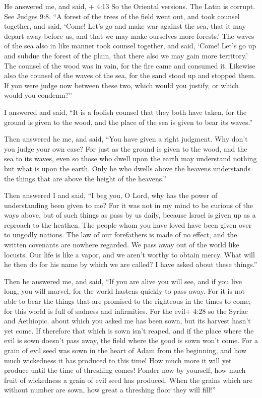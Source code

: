  He answered me, and said, + 4:13 So the Oriental versions.
The Latin is corrupt. See Judges 9:8. ``A forest of the trees of the
field went out, and took counsel together,  and said,
`Come! Let's go and make war against the sea, that it may depart away
before us, and that we may make ourselves more forests.' 
The waves of the sea also in like manner took counsel together, and
said, `Come! Let's go up and subdue the forest of the plain, that there
also we may gain more territory.'  The counsel of the wood
was in vain, for the fire came and consumed it.  Likewise
also the counsel of the waves of the sea, for the sand stood up and
stopped them.  If you were judge now between these two,
which would you justify, or which would you condemn?''

 I answered and said, ``It is a foolish counsel that they
both have taken, for the ground is given to the wood, and the place of
the sea is given to bear its waves.''

 Then answered he me, and said, ``You have given a right
judgment. Why don't you judge your own case?  For just as
the ground is given to the wood, and the sea to its waves, even so those
who dwell upon the earth may understand nothing but what is upon the
earth. Only he who dwells above the heavens understands the things that
are above the height of the heavens.''

 Then answered I and said, ``I beg you, O Lord, why has the
power of understanding been given to me?  For it was not in
my mind to be curious of the ways above, but of such things as pass by
us daily, because Israel is given up as a reproach to the heathen. The
people whom you have loved have been given over to ungodly nations. The
law of our forefathers is made of no effect, and the written covenants
are nowhere regarded.  We pass away out of the world like
locusts. Our life is like a vapor, and we aren't worthy to obtain mercy.
 What will he then do for his name by which we are called?
I have asked about these things.''

 Then he answered me, and said, ``If you are alive you will
see, and if you live long, you will marvel, for the world hastens
quickly to pass away.  For it is not able to bear the
things that are promised to the righteous in the times to come; for this
world is full of sadness and infirmities.  For the evil+
4:28 so the Syriac and Aethiopic. about which you asked me has been
sown, but its harvest hasn't yet come.  If therefore that
which is sown isn't reaped, and if the place where the evil is sown
doesn't pass away, the field where the good is sown won't come.
 For a grain of evil seed was sown in the heart of Adam
from the beginning, and how much wickedness it has produced to this
time! How much more it will yet produce until the time of threshing
comes!  Ponder now by yourself, how much fruit of
wickedness a grain of evil seed has produced.  When the
grains which are without number are sown, how great a threshing floor
they will fill!''

